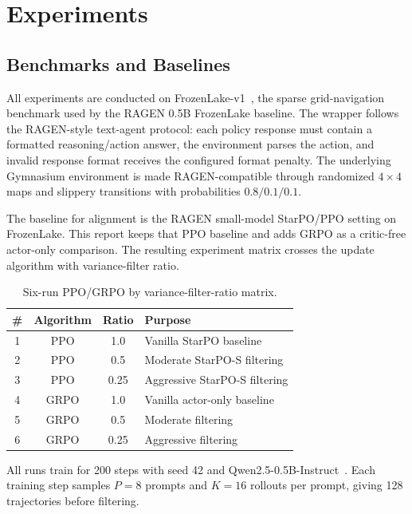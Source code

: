 \section{Experiments}
\label{sec:setup}

\subsection{Benchmarks and Baselines}

All experiments are conducted on FrozenLake-v1~\citep{brockman2016gym}, the sparse grid-navigation benchmark used by the RAGEN 0.5B FrozenLake baseline. The wrapper follows the RAGEN-style text-agent protocol: each policy response must contain a formatted reasoning/action answer, the environment parses the action, and invalid response format receives the configured format penalty. The underlying Gymnasium environment is made RAGEN-compatible through randomized \(4\times4\) maps and slippery transitions with probabilities \(0.8/0.1/0.1\).

The baseline for alignment is the RAGEN small-model StarPO/PPO setting on FrozenLake. This report keeps that PPO baseline and adds GRPO as a critic-free actor-only comparison. The resulting experiment matrix crosses the update algorithm with variance-filter ratio.

\begin{table}[t]
\centering
\small
\begin{tabularx}{\linewidth}{c c c X}
\toprule
\# & Algorithm & Ratio & Purpose \\
\midrule
1 & PPO & 1.0 & Vanilla StarPO baseline \\
2 & PPO & 0.5 & Moderate StarPO-S filtering \\
3 & PPO & 0.25 & Aggressive StarPO-S filtering \\
4 & GRPO & 1.0 & Vanilla actor-only baseline \\
5 & GRPO & 0.5 & Moderate filtering \\
6 & GRPO & 0.25 & Aggressive filtering \\
\bottomrule
\end{tabularx}
\caption{Six-run PPO/GRPO by variance-filter-ratio matrix.}
\label{tab:matrix}
\end{table}

All runs train for 200 steps with seed 42 and Qwen2.5-0.5B-Instruct~\citep{yang2024qwen25}. Each training step samples \(P=8\) prompts and \(K=16\) rollouts per prompt, giving 128 trajectories before filtering.

